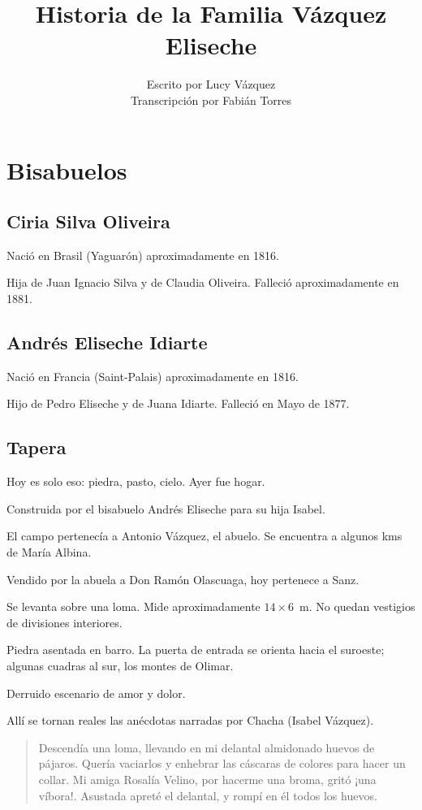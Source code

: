 \documentclass[a4paper]{article}
\title{Historia de la Familia Vázquez Eliseche}
\author{Escrito por Lucy Vázquez\\ Transcripción por Fabián Torres}
\date{}
\begin{document}
\maketitle
\newpage
\tableofcontents
\newpage

\section{Bisabuelos}

\subsection{Ciria Silva Oliveira}

Nació en Brasil (Yaguarón) aproximadamente en 1816.

Hija de Juan Ignacio Silva y de Claudia Oliveira. Falleció aproximadamente en 1881.

\subsection{Andrés Eliseche Idiarte}

Nació en Francia (Saint-Palais) aproximadamente en 1816.

Hijo de Pedro Eliseche y de Juana Idiarte. Falleció en Mayo de 1877.

\subsection{Tapera}

Hoy es solo eso: piedra, pasto, cielo. Ayer fue hogar.

Construida por el bisabuelo Andrés Eliseche para su hija Isabel.

El campo pertenecía a Antonio Vázquez, el abuelo. Se encuentra a algunos kms de María Albina.

Vendido por la abuela a Don Ramón Olascuaga, hoy pertenece a Sanz.

Se levanta sobre una loma. Mide aproximadamente $14\times6$~m. No quedan vestigios de divisiones interiores.

Piedra asentada en barro. La puerta de entrada se orienta hacia el suroeste; algunas cuadras al sur, los montes de Olimar.

Derruido escenario de amor y dolor.

Allí se tornan reales las anécdotas narradas por Chacha (Isabel Vázquez).

\begin{quote}
    Descendía una loma, llevando en mi delantal almidonado huevos de pájaros. Quería vaciarlos y enhebrar las cáscaras de colores para hacer un collar. Mi amiga Rosalía Velino, por hacerme una broma, gritó ¡una víbora!. Asustada apreté el delantal, y rompí en él todos los huevos.
\end{quote}
\end{document}
